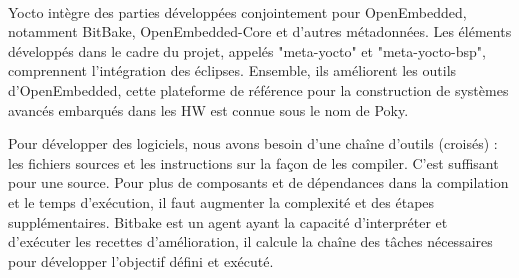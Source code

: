 \paragraph{}
Yocto intègre des parties développées conjointement pour OpenEmbedded, notamment BitBake, OpenEmbedded-Core et d'autres métadonnées. 
Les éléments développés dans le cadre du projet, appelés "meta-yocto" et "meta-yocto-bsp", comprennent l'intégration des éclipses. 
Ensemble, ils améliorent les outils d'OpenEmbedded, cette plateforme de référence pour la construction de systèmes avancés embarqués dans les HW est connue 
sous le nom de Poky.

Pour développer des logiciels, nous avons besoin d'une chaîne d'outils (croisés) : les fichiers sources et les instructions sur la façon de les compiler. 
C'est suffisant pour une source. 
Pour plus de composants et de dépendances dans la compilation et le temps d'exécution, il faut augmenter la complexité et des étapes supplémentaires. 
Bitbake est un agent ayant la capacité d'interpréter et d'exécuter les recettes d'amélioration, il calcule la chaîne des tâches nécessaires pour développer l'objectif défini et exécuté. 

